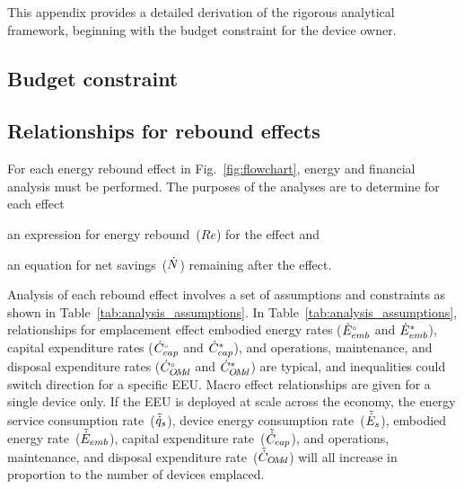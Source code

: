 

This appendix provides a detailed derivation of 
the rigorous analytical framework,
beginning with the budget constraint for the device owner.


\subsection{Budget constraint}
\label{sec:budget_constraint}







\subsection{Relationships for rebound effects}
\label{sec:relationships_for_stages}

For each energy rebound effect in Fig.~\ref{fig:flowchart},
energy and financial analysis must be performed.
The purposes of the analyses are to determine for each effect
%
\begin{enumerate*}[label={(\roman*)}]

  \item an expression for energy rebound~($Re$) for the effect and

  \item an equation for net savings~($\dot{N}$) remaining after the effect.

\end{enumerate*}

Analysis of each rebound effect
involves a set of assumptions and constraints
as shown in Table~\ref{tab:analysis_assumptions}.
In Table~\ref{tab:analysis_assumptions}, 
relationships for emplacement effect 
embodied energy rates (${}{\dot{E}}^{\scriptscriptstyle \circ}_{emb}$ and ${\dot{E}}^*_{emb}$), 
capital expenditure rates (${}{\dot{C}}^{\scriptscriptstyle \circ}_{cap}$ and ${\dot{C}}^*_{cap}$), and 
operations, maintenance, and disposal 
expenditure rates (${}{\dot{C}}^{\scriptscriptstyle \circ}_{O\!M\!d}$ and ${\dot{C}}^*_{O\!M\!d}$)
are typical, and
inequalities could switch direction for a specific EEU.
Macro effect relationships are given for a single device only.
If the EEU is deployed at scale across the economy, 
the energy service consumption rate~($\tilde{\dot{q}}_s$), 
device energy consumption rate~($\tilde{\dot{E}}_s$), 
embodied energy rate~($\tilde{\dot{E}}_{emb}$),
capital expenditure rate~($\tilde{\dot{C}}_{cap}$), and 
operations, maintenance, and disposal expenditure rate~($\tilde{\dot{C}}_{O\!M\!d}$)
will all increase in proportion to the number of devices emplaced.

